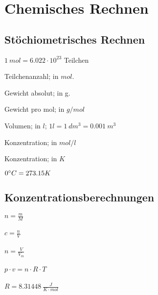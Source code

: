 \section{Chemisches Rechnen}

\subsection{Stöchiometrisches Rechnen}

\begin{definition}[mol]
	$1 \ mol = 6.022 \cdot 10^{23}$ Teilchen
\end{definition}

\begin{definition}[n]
	Teilchenanzahl; in $mol$.
\end{definition}

\begin{definition}[m]
	Gewicht absolut; in g.
\end{definition}

\begin{definition}[M]
	Gewicht pro mol; in $g/mol$
\end{definition}

\begin{definition}[V]

	Volumen; in	$l$; $1l=1\ dm^3=0.001\ m^3$
\end{definition}

\begin{definition}[c]
	Konzentration; in $mol/l$
\end{definition}

\begin{definition}[T]
	Konzentration; in $K$
	
	$0\degree C = 273.15K$
\end{definition}

\subsection{Konzentrationsberechnungen}

\large{
	$n=\frac{m}{M}$
	\\ \\
	$c=\frac{n}{V}$
	\\ \\
	$n = \frac{V}{V_m}$
	\\ \\
	$ p \cdot v = n \cdot R \cdot T $
	\\ \\
	$R = 8.31448 \ \frac{J}{K \cdot mol}$
}
